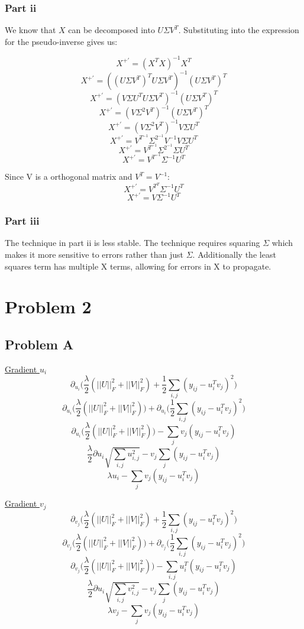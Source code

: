 \documentclass[12pt]{article} %
\begin{document}
\subsubsection{Part ii}
We know that $X$ can be decomposed into $U\Sigma V^T$. Substituting into the expression for the pseudo-inverse gives us:

$$X^{+'} = (X^T X)^{-1}X^T$$
$$X^{+'} = ((U\Sigma V^T)^T U\Sigma V^T)^{-1}(U\Sigma V^T)^T$$
$$X^{+'} = (V\Sigma U^T U\Sigma V^T)^{-1}(U\Sigma V^T)^T$$
$$X^{+'} = (V \Sigma^2 V^T)^{-1}(U\Sigma V^T)^T$$
$$X^{+'} = (V \Sigma^2 V^T)^{-1}V\Sigma U^T$$
$$X^{+'} = V^{T ^ {-1}} \Sigma^{2^{-1}} V^{-1}V\Sigma U^T$$
$$X^{+'} = V^{T ^ {-1}} \Sigma^{2^{-1}} \Sigma U^T$$
$$X^{+'} = V^{T ^ {-1}} \Sigma^{-1}  U^T$$

Since V is a orthogonal matrix and $V^T = V^{-1}$:
$$X^{+'} = V^{T ^ {T}} \Sigma^{-1}  U^T$$
$$X^{+'} = V \Sigma^{-1}  U^T$$

\subsubsection{Part iii}
The technique in part ii is less stable. The technique requires squaring $\Sigma$ which makes it more sensitive to errors rather than just $\Sigma$. Additionally the least squares term has multiple X terms, allowing for errors in X to propagate.

\section{Problem 2}

\subsection{Problem A}
\underline{Gradient $u_i$}
$$\partial_{u_i}\bigg(\frac{\lambda}{2}(||U||_F^2 + ||V||_F^2) + \frac{1}{2}\sum_{i, j} (y_{ij} - u_i^Tv_j)^2\bigg)$$
%
$$\partial_{u_i}\bigg(\frac{\lambda}{2}(||U||_F^2 + ||V||_F^2)\bigg) + \partial_{u_i}\bigg(\frac{1}{2}\sum_{i, j} (y_{ij} - u_i^Tv_j)^2\bigg)$$
%
$$\partial_{u_i}\bigg(\frac{\lambda}{2}(||U||_F^2 + ||V||_F^2)\bigg) -\sum_{j}v_j (y_{ij} - u_i^Tv_j)$$
%
$$\frac{\lambda}{2}\partial{u_i}\sqrt{\sum_{i, j} u_{i,j}^2} -v_j\sum_{j} (y_{ij} - u_i^Tv_j)$$
%
$$\lambda u_i -\sum_{j} v_j(y_{ij} - u_i^Tv_j)$$

\underline{Gradient $v_j$}
%
$$\partial_{v_j}\bigg(\frac{\lambda}{2}(||U||_F^2 + ||V||_F^2) + \frac{1}{2}\sum_{i, j} (y_{ij} - u_i^Tv_j)^2\bigg)$$
%
$$\partial_{v_j}\bigg(\frac{\lambda}{2}(||U||_F^2 + ||V||_F^2)\bigg) + \partial_{v_j}\bigg(\frac{1}{2}\sum_{i, j} (y_{ij} - u_i^Tv_j)^2\bigg)$$
%
$$\partial_{v_j}\bigg(\frac{\lambda}{2}(||U||_F^2 + ||V||_F^2)\bigg) -\sum_{i, j} u_i^T (y_{ij} - u_i^Tv_j)$$
%
$$\frac{\lambda}{2}\partial{u_i}\sqrt{\sum_{i, j} v_{i,j}^2} -v_j\sum_{j} (y_{ij} - u_i^Tv_j)$$
%
$$\lambda v_j - \sum_{j} v_j (y_{ij} - u_i^Tv_j)$$
\end{document}
